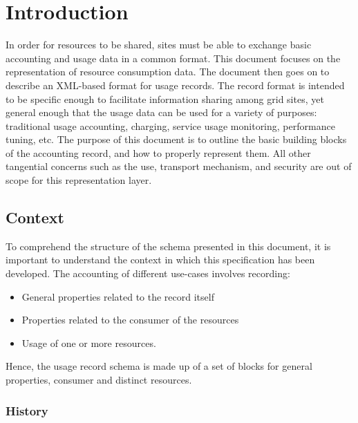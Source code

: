 
\section{Introduction}
\label{s:introduction}

In order for resources to be shared, sites must be able to exchange basic accounting and usage data in a common format. This document focuses on the representation of resource consumption data. The document then goes on to describe an XML-based format for usage records. The record format is intended to be specific enough to facilitate information sharing among grid sites, yet general enough that the usage data can be used for a variety of purposes: traditional usage accounting, charging, service usage monitoring, performance tuning, etc. The purpose of this document is to outline the basic building blocks of the accounting record, and how to properly represent them. All other tangential concerns such as the use, transport mechanism, and security are out of scope for this representation layer.






\subsection{Context}

To comprehend the structure of the schema presented in this document, it is important to understand the context in which this specification has been developed. The accounting of different use-cases involves recording:

\begin{itemize}
\item General properties related to the record itself
\item Properties related to the consumer of the resources
\item Usage of one or more resources.
\end{itemize}

Hence, the usage record schema is made up of a set of blocks for general properties, consumer and distinct resources. 






\subsubsection{History}


